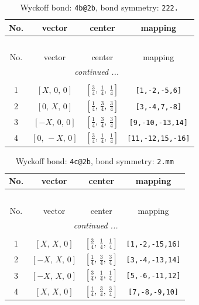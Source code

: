 \documentclass[fleqn,8pt]{jsarticle}
\begin{document}
\begin{longtable}{cccc}
\caption{Wyckoff bond: {\tt 4b@2b}, bond symmetry: {\tt 222.}}
 \\
 \hline \hline
No. & vector & center & mapping \\ \hline \endfirsthead

\multicolumn{3}{l}{\tablename\ \thetable{}} \\
 \hline \hline
No. & vector & center & mapping \\ \hline \endhead

 \hline \hline
\multicolumn{3}{r}{\footnotesize\it continued ...} \\ \endfoot

 \hline \hline
\multicolumn{3}{r}{} \\ \endlastfoot

1 & $\left[ X,\, 0,\, 0 \right]$ & $\left[ \frac{3}{4},\, \frac{1}{4},\, \frac{1}{4} \right]$ & {\tt [1,-2,-5,6]} \\ \hline
2 & $\left[ 0,\, X,\, 0 \right]$ & $\left[ \frac{1}{4},\, \frac{3}{4},\, \frac{3}{4} \right]$ & {\tt [3,-4,7,-8]} \\ \hline
3 & $\left[ - X,\, 0,\, 0 \right]$ & $\left[ \frac{1}{4},\, \frac{3}{4},\, \frac{3}{4} \right]$ & {\tt [9,-10,-13,14]} \\ \hline
4 & $\left[ 0,\, - X,\, 0 \right]$ & $\left[ \frac{3}{4},\, \frac{1}{4},\, \frac{1}{4} \right]$ & {\tt [11,-12,15,-16]} \\
\end{longtable}
\renewcommand{\arraystretch}{1.2}
\begin{longtable}{cccc}
\caption{Wyckoff bond: {\tt 4c@2b}, bond symmetry: {\tt 2.mm}}
 \\
 \hline \hline
No. & vector & center & mapping \\ \hline \endfirsthead

\multicolumn{3}{l}{\tablename\ \thetable{}} \\
 \hline \hline
No. & vector & center & mapping \\ \hline \endhead

 \hline \hline
\multicolumn{3}{r}{\footnotesize\it continued ...} \\ \endfoot

 \hline \hline
\multicolumn{3}{r}{} \\ \endlastfoot

1 & $\left[ X,\, X,\, 0 \right]$ & $\left[ \frac{3}{4},\, \frac{1}{4},\, \frac{1}{4} \right]$ & {\tt [1,-2,-15,16]} \\ \hline
2 & $\left[ - X,\, X,\, 0 \right]$ & $\left[ \frac{1}{4},\, \frac{3}{4},\, \frac{3}{4} \right]$ & {\tt [3,-4,-13,14]} \\ \hline
3 & $\left[ - X,\, X,\, 0 \right]$ & $\left[ \frac{3}{4},\, \frac{1}{4},\, \frac{1}{4} \right]$ & {\tt [5,-6,-11,12]} \\ \hline
4 & $\left[ X,\, X,\, 0 \right]$ & $\left[ \frac{1}{4},\, \frac{3}{4},\, \frac{3}{4} \right]$ & {\tt [7,-8,-9,10]} \\
\end{longtable}
\end{document}

